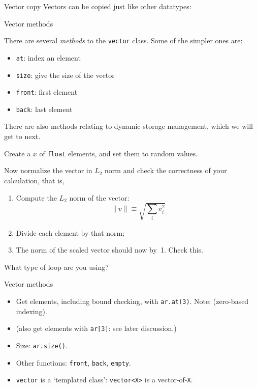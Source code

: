 \begin{block}{Vector copy}
  \label{sl:vectorcopy}
  Vectors can be copied just like other datatypes:
\end{block}

 {Vector methods}

There are several \emph{methods}
to the \lstinline{vector} class. Some of the simpler ones are:
\begin{itemize}
\item \lstinline{at}: index an element
\item \lstinline{size}: give the size of the vector
\item \lstinline{front}: first element
\item \lstinline{back}: last element
\end{itemize}

There are also methods relating to dynamic storage management, which
we will get to next.

\begin{exercise}
  \label{ex:vectornormalize}
  Create a  $x$ of \lstinline{float} elements, and set them to random
  values.

  Now normalize the vector in $L_2$ norm and check the correctness of
  your calculation, that is,
  \begin{enumerate}
  \item Compute the $L_2$ norm of the vector:
    \[ \| v\| \equiv \sqrt{\sum_iv_i^2} \]
  \item Divide each element by that norm;
  \item The norm of the scaled vector should now by~1. Check this.
  \end{enumerate}
  What type of loop are you using?
\end{exercise}

\begin{slide}{Vector methods}
  \label{sl:vector-method}
  \begin{itemize}
  \item Get elements, including bound checking, with
    \lstinline{ar.at(3)}.
    Note: (zero-based indexing).
  \item (also get elements with \lstinline{ar[3]}: see later discussion.)
  \item Size: \lstinline{ar.size()}.
  \item Other functions: \lstinline{front}, \lstinline{back}, \lstinline{empty}.
  \item \lstinline{vector} is a `templated class':
    \lstinline{vector<X>} is a vector-of-\lstinline{X}.
  \end{itemize}
\end{slide}

